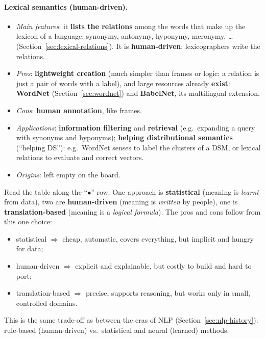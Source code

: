 \paragraph{Lexical semantics (human-driven).}
\begin{itemize}[nosep]
  \item \emph{Main features}: it \textbf{lists the relations} among the words that make
        up the lexicon of a language: synonymy, antonymy, hyponymy, meronymy, \ldots
        (Section~\ref{sec:lexical-relations}). It is \textbf{human-driven}: lexicographers
        write the relations.
  \item \emph{Pros}: \textbf{lightweight creation} (much simpler than frames or logic:
        a relation is just a pair of words with a label), and large resources already
        \textbf{exist}: \textbf{WordNet} (Section~\ref{sec:wordnet}) and
        \textbf{BabelNet}, its multilingual extension.
  \item \emph{Cons}: \textbf{human annotation}, like frames.
  \item \emph{Applications}: \textbf{information filtering} and \textbf{retrieval} (e.g.\
        expanding a query with synonyms and hyponyms); \textbf{helping distributional
        semantics} (``helping DS''): e.g.\ WordNet senses to label the clusters of a
        DSM, or lexical relations to evaluate and correct vectors.
  \item \emph{Origins}: left empty on the board.
\end{itemize}

\begin{nbintuition}
Read the table along the ``$\bullet$'' row. One approach is \textbf{statistical}
(meaning is \emph{learnt} from data), two are \textbf{human-driven} (meaning is
\emph{written} by people), one is \textbf{translation-based} (meaning is a
\emph{logical formula}). The pros and cons follow from this one choice:
\begin{itemize}[nosep]
  \item statistical $\Rightarrow$ cheap, automatic, covers everything, but implicit and
        hungry for data;
  \item human-driven $\Rightarrow$ explicit and explainable, but costly to build and hard
        to port;
  \item translation-based $\Rightarrow$ precise, supports reasoning, but works only in
        small, controlled domains.
\end{itemize}
This is the same trade-off as between the eras of NLP (Section~\ref{sec:nlp-history}):
rule-based (human-driven) vs.\ statistical and neural (learned) methods.
\end{nbintuition}

